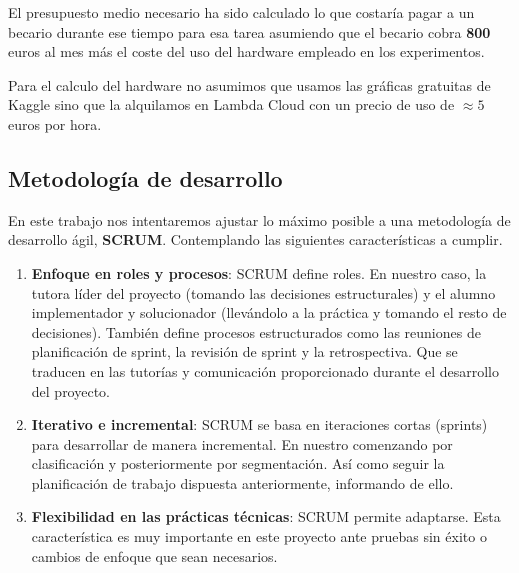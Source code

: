 El presupuesto medio necesario ha sido calculado lo que costaría pagar a un becario durante ese tiempo  para esa tarea asumiendo que el becario cobra \textbf{800} euros al mes más el coste del uso del hardware empleado en los experimentos. 

Para el calculo del hardware no asumimos que usamos las gráficas gratuitas de Kaggle sino que la alquilamos en Lambda Cloud con un precio de uso de $\approx 5$ euros por hora.


\subsection{Metodología de desarrollo}

En este trabajo nos intentaremos ajustar lo máximo posible a una metodología de desarrollo ágil, \textbf{SCRUM}. Contemplando las siguientes características a cumplir.

\begin{enumerate}
	\item \textbf{Enfoque en roles y procesos}: SCRUM define roles. En nuestro caso, la tutora líder del proyecto (tomando las decisiones estructurales) y el alumno implementador y solucionador (llevándolo a la práctica y tomando el resto de decisiones). También define procesos estructurados como las reuniones de planificación de sprint, la revisión de sprint y la retrospectiva. Que se traducen en las tutorías y comunicación proporcionado durante el desarrollo del proyecto.
	
	\item \textbf{Iterativo e incremental}: SCRUM se basa en iteraciones cortas (sprints) para desarrollar de manera incremental. En nuestro comenzando por clasificación y posteriormente por segmentación. Así como seguir la planificación de trabajo dispuesta anteriormente, informando de ello.
	
	\item \textbf{Flexibilidad en las prácticas técnicas}: SCRUM permite adaptarse. Esta característica es muy importante en este proyecto ante pruebas sin éxito o cambios de enfoque que sean necesarios.
\end{enumerate}